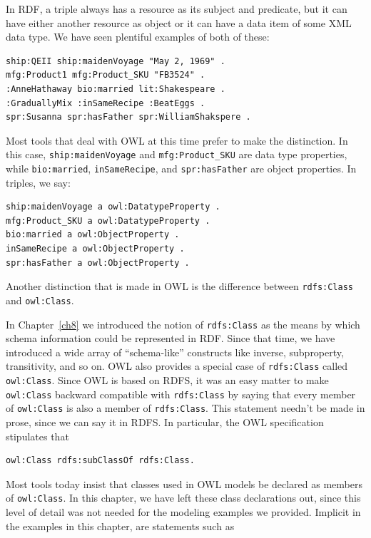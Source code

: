 In RDF, a triple always has a resource as its subject and predicate, but
it can have either another
resource as object or it can have a data item of some XML data type. We
have seen plentiful examples of both of these:

\begin{lstlisting}
ship:QEII ship:maidenVoyage "May 2, 1969" .
mfg:Product1 mfg:Product_SKU "FB3524" .
:AnneHathaway bio:married lit:Shakespeare .
:GraduallyMix :inSameRecipe :BeatEggs .
spr:Susanna spr:hasFather spr:WilliamShakspere .
\end{lstlisting}

Most tools that deal with OWL at this time prefer to make the
distinction. In this case, \texttt{ship:maidenVoyage} and \texttt{mfg:Product\_SKU} are
data type properties, while \texttt{bio:married}, \texttt{inSameRecipe}, and \texttt{spr:hasFather}
are object properties. In triples, we say:

\begin{lstlisting}
ship:maidenVoyage a owl:DatatypeProperty .
mfg:Product_SKU a owl:DatatypeProperty .
bio:married a owl:ObjectProperty .
inSameRecipe a owl:ObjectProperty .
spr:hasFather a owl:ObjectProperty .
\end{lstlisting}

Another distinction that is made in OWL is the difference between
\texttt{rdfs:Class} and \texttt{owl:Class}.

In Chapter~\ref{ch8} we introduced the notion of \texttt{rdfs:Class} as the means by
which schema information could be represented in RDF. Since that time,
we have introduced a wide array of ``schema-like'' constructs like
inverse, subproperty, transitivity, and so on. OWL also provides a
special case of \texttt{rdfs:Class} called \texttt{owl:Class}. Since OWL is based on RDFS,
it was an easy matter to make \texttt{owl:Class} backward compatible with
\texttt{rdfs:Class} by saying that every member of \texttt{owl:Class} is also a member of
\texttt{rdfs:Class}. This statement needn't be made in prose, since we can say it
in RDFS. In particular, the OWL specification stipulates that

\begin{lstlisting}
owl:Class rdfs:subClassOf rdfs:Class.
\end{lstlisting}

Most tools today insist that classes used in OWL models be declared as
members of \texttt{owl:Class}. In this chapter, we have left these class
declarations out, since this level of detail was not needed for the
modeling examples we provided. Implicit in the examples in this chapter,
are statements such as

